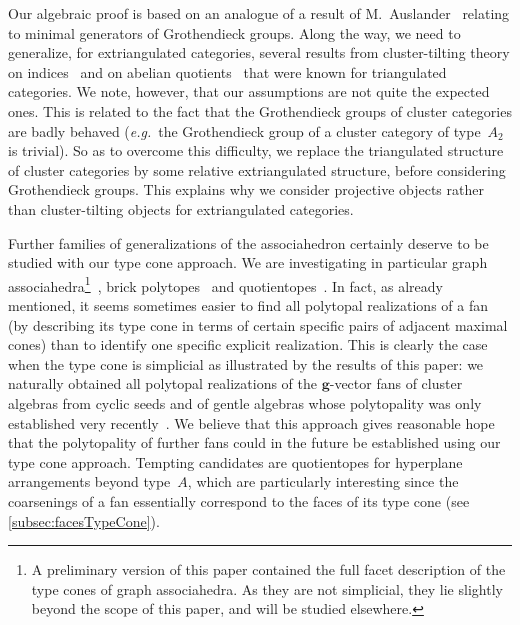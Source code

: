 \documentclass{amsart}
\theoremstyle{definition}
\renewcommand{\b}[1]{{\boldsymbol{#1}}} %
\newcommand{\eg}{\textit{e.g.}~} %
\begin{document}
Our algebraic proof is based on an analogue of a result of M.~Auslander~\cite{Auslander1984} relating to minimal generators of Grothendieck groups.
Along the way, we need to generalize, for extriangulated categories, several results from cluster-tilting theory on indices~\cite{DehyKeller} and on abelian quotients~\cite{BuanMarshReiten, KellerReiten} that were known for triangulated categories. We note, however, that our assumptions are not quite the expected ones. This is related to the fact that the Grothendieck groups of cluster categories are badly behaved (\eg the Grothendieck group of a cluster category of type~$A_2$ is trivial). So as to overcome this difficulty, we replace the triangulated structure of cluster categories by some relative extriangulated structure, before considering Grothendieck groups. This explains why we consider projective objects rather than cluster-tilting objects for extriangulated categories.

\medskip
\enlargethispage{.5cm}
Further families of generalizations of the associahedron certainly deserve to be studied with our type cone approach.
We are investigating in particular graph associahedra\footnote{A preliminary version of this paper contained the full facet description of the type cones of graph associahedra. As they are not simplicial, they lie slightly beyond the scope of this paper, and will be studied elsewhere.}~\cite{CarrDevadoss, Postnikov, FeichtnerSturmfels, Zelevinsky}, brick polytopes~\cite{PilaudSantos-brickPolytope, PilaudStump-brickPolytope} and quotientopes~\cite{Reading-latticeCongruences, Reading-CambrianLattices, PilaudSantos-quotientopes}.
In fact, as already mentioned, it seems sometimes easier to find all polytopal realizations of a fan (by describing its type cone in terms of certain specific pairs of adjacent maximal cones) than to identify one specific explicit realization.
This is clearly the case when the type cone is simplicial as illustrated by the results of this paper: we naturally obtained all polytopal realizations of the $\b{g}$-vector fans of cluster algebras from cyclic seeds and of gentle algebras whose polytopality was only established very recently~\cite{HohlwegPilaudStella, PaluPilaudPlamondon-nonkissing}.
We believe that this approach gives reasonable hope that the polytopality of further fans could in the future be established using our type cone approach.
Tempting candidates are quotientopes for hyperplane arrangements beyond type~$A$, which are particularly interesting since the coarsenings of a fan essentially correspond to the faces of its type cone (see \cref{subsec:facesTypeCone}).
\end{document}

